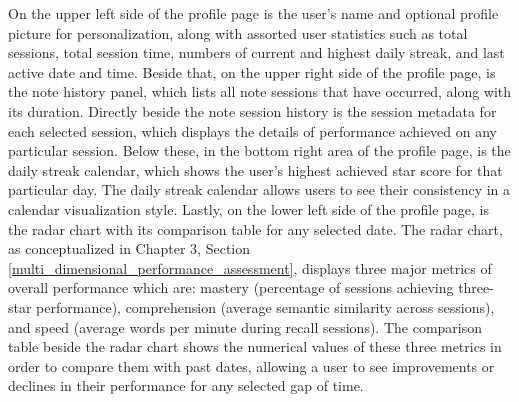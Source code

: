 On the upper left side of the profile page is the user's name and optional profile picture for personalization, along with assorted user statistics such as total sessions, total session time, numbers of current and highest daily streak, and last active date and time. Beside that, on the upper right side of the profile page, is the note history panel, which lists all note sessions that have occurred, along with its duration. Directly beside the note session history is the session metadata for each selected session, which displays the details of performance achieved on any particular session. Below these, in the bottom right area of the profile page, is the daily streak calendar, which shows the user's highest achieved star score for that particular day. The daily streak calendar allows users to see their consistency in a calendar visualization style. Lastly, on the lower left side of the profile page, is the radar chart with its comparison table for any selected date. The radar chart, as conceptualized in Chapter 3, Section \ref{multi_dimensional_performance_assessment}, displays three major metrics of overall performance which are: mastery (percentage of sessions achieving three-star performance), comprehension (average semantic similarity across sessions), and speed (average words per minute during recall sessions). The comparison table beside the radar chart shows the numerical values of these three metrics in order to compare them with past dates, allowing a user to see improvements or declines in their performance for any selected gap of time.


